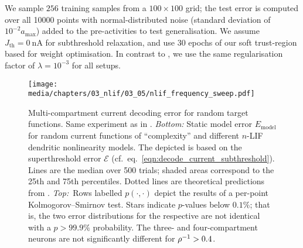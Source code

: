 We sample $256$ training samples from a $100 \times 100$ grid; the test error is computed over all \num{10000} points with normal-distributed noise (standard deviation of $10^{-2} a_\mathrm{max}$) added to the pre-activities to test generalisation.
We assume $J_\mathrm{th} = \SI{0}{\nano\ampere}$ for subthreshold relaxation, and use $30$ epochs of our soft trust-region based \SQP for weight optimisation.
In contrast to , we use the same regularisation factor of $\lambda = 10^{-3}$ for all setups.

\begin{figure}
	\centering
	\texttt{[image: media/chapters/03\_nlif/03\_05/nlif\_frequency\_sweep.pdf]}
	\caption[Multi-compartment current decoding error for random target functions]{Multi-compartment current decoding error for random target functions. Same experiment as in .
	\emph{Bottom:}
	Static model error $E_\mathrm{model}$ for random current functions of \enquote{complexity} \slc and different $n$-LIF dendritic nonlinearity models.
	The depicted \NRMSE is based on the superthreshold error $\mathcal{E}$ (cf.~eq.~\ref{eqn:decode_current_subthreshold}).
	Lines are the median over \num{500} trials; shaded areas correspond to the 25th and 75th percentiles.
	Dotted lines are theoretical predictions from .
	\emph{Top:}~Rows labelled $p(\cdot, \cdot)$ depict the results of a per-point Kolmogorov–Smirnov test.
	Stars indicate $p$-values below $0.1\%$; that is, the two error distributions for the respective \slc are not identical with a $p > 99.9\%$ probability.
	The three- and four-compartment neurons are not significantly different for ${\rho^{-1}} > 0.4$.
	}
	\label{fig:nlif_frequency_sweep}
\end{figure}

